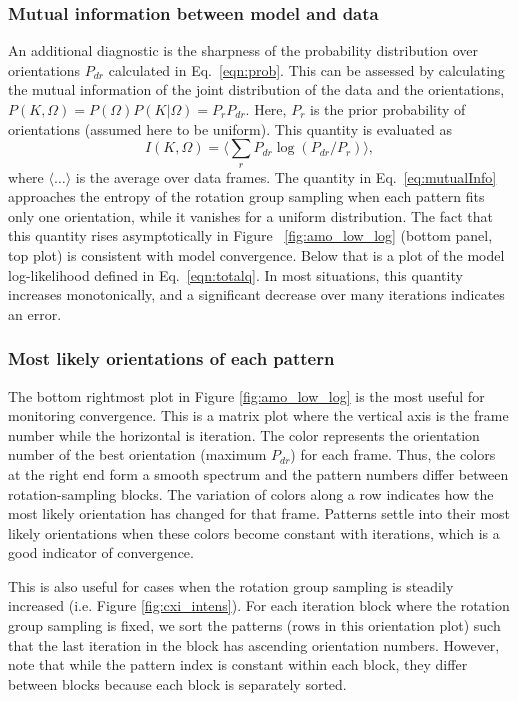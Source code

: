 \documentclass[]{iucr}              %
\begin{document}
\subsubsection{Mutual information between model and data}
An additional diagnostic is the sharpness of the probability distribution over orientations $P_{dr}$ calculated in Eq.~\ref{eqn:prob}. This can be assessed by calculating the mutual information of the joint distribution of the data and the orientations, $P(K,\Omega) = P(\Omega) P(K{\big\vert}\Omega) = P_r P_{dr}$. Here, $P_r$ is the prior probability of orientations (assumed here to be uniform). This quantity is evaluated as
\begin{equation}
I(K, \Omega) = \langle\sum_r P_{dr} \log(P_{dr} / P_{r})\rangle, \label{eq:mutualInfo}
\end{equation}
where $\langle \dots \rangle$ is the average over data frames. The quantity in Eq.~\ref{eq:mutualInfo} approaches the entropy of the rotation group sampling when each pattern fits only one orientation, while it vanishes for a uniform distribution. The fact that this quantity rises asymptotically in Figure ~\ref{fig:amo_low_log} (bottom panel, top plot) is consistent with model convergence. Below that is a plot of the model log-likelihood defined in Eq.~\ref{eqn:totalq}. In most situations, this quantity increases monotonically, and a significant decrease over many iterations indicates an error. 

\subsubsection{Most likely orientations of each pattern}
The bottom rightmost plot in Figure \ref{fig:amo_low_log} is the most useful for monitoring convergence. This is a matrix plot where the vertical axis is the frame number while the horizontal is iteration. The color represents the orientation number of the best orientation (maximum $P_{dr}$) for each frame. Thus, the colors at the right end form a smooth spectrum and the pattern numbers differ between rotation-sampling blocks. The variation of colors along a row indicates how the most likely orientation has changed for that frame. Patterns settle into their most likely orientations when these colors become constant with iterations, which is a good indicator of convergence.

This is also useful for cases when the rotation group sampling is steadily increased (i.e. Figure \ref{fig:cxi_intens}). For each iteration block where the rotation group sampling is fixed, we sort the patterns (rows in this orientation plot) such that the last iteration in the block has ascending orientation numbers. However, note that while the pattern index is constant within each block, they differ between blocks because each block is separately sorted.
\end{document}
